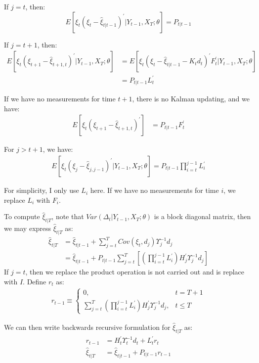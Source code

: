 \documentclass[10pt]{article}
\numberwithin{equation}{section}
\begin{document}
If $j=t$, then:
\[
    E[\xi_t(\xi_t-\hat{\xi}_{t|t-1})^{'}|Y_{t-1},X_T;\theta] = P_{t|t-1}
\]

If $j=t+1$, then:
\begin{align*}
    E[\xi_t(\xi_{t+1}-\hat{\xi}_{t+1,t})^{'}|Y_{t-1},X_T;\theta] &= E[\xi_t(\xi_t-\hat{\xi}_{t|t-1}-K_td_t)^{'}F_t^{'}|Y_{t-1},X_T;\theta] \\
    &= P_{t|t-1}L_t^{'}
\end{align*}

If we have no measurements for time $t+1$, there is no Kalman updating, and we have:
\begin{align*}
    E[\xi_t(\xi_{t+1}-\hat{\xi}_{t+1,t})^{'}]&= P_{t|t-1}F_t^{'}
\end{align*}

For $j>t+1$, we have:
\begin{align*}
    E[\xi_t(\xi_{j}-\hat{\xi}_{j,j-1})^{'}|Y_{t-1},X_T;\theta] = P_{t|t-1}\prod_{i=t}^{j-1}L_i^{'}
\end{align*}

For simplicity, I only use $L_i$ here. If we have no measurements for time $i$, we replace $L_i$ with $F_i$. 

To compute $\hat{\xi}_{t|T}$, note that $Var(\Delta_{t}|Y_{t-1},X_T;\theta)$ is a block diagonal matrix, then we may express $\hat{\xi}_{t|T}$ as:
\begin{align*}
    \hat{\xi}_{t|T} &= \hat{\xi}_{t|t-1} + \sum_{j=t}^{T}Cov(\xi_t,d_j)\Upsilon_j^{-1}d_j \\
    &= \hat{\xi}_{t|t-1} + P_{t|t-1}\sum_{j=t}^T\left[\left(\prod_{i=t}^{j-1}L_{i}^{'}\right)H_j^{'}\Upsilon_j^{-1}d_j\right]
\end{align*}
If $j=t$, then we replace the product operation is not carried out and is replace with $I$. Define $r_t$ as:
\begin{align*}
    r_{t-1} \equiv \begin{cases}
        0, & t=T+1 \\
        \sum_{j=t}^T\left(\prod_{i=t}^{j-1}L_{i}^{'}\right)H_j^{'}\Upsilon_j^{-1}d_j, & t\leq T
    \end{cases}
\end{align*}

We can then write backwards recursive formulation for $\hat{\xi}_{t|T}$ as:
\begin{align*}
    r_{t-1} &= H_t^{'}\Upsilon_t^{-1}d_t + L_t^{'}r_t \\
    \hat{\xi}_{t|T} &= \hat{\xi}_{t|t-1} + P_{t|t-1}r_{t-1} 
\end{align*}
\end{document}
